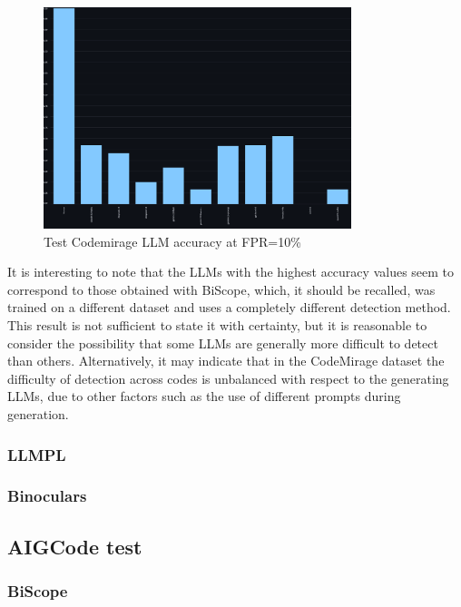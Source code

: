\begin{figure}[H]
    \centering
    \includegraphics[width=0.8\textwidth]{img/TEST/UncovernngLLM/Clearcode/visualization(10).png}
    \caption{Test Codemirage LLM accuracy at FPR=10\%}
    \label{fig:9}
\end{figure}

It is interesting to note that the LLMs with the highest accuracy values 
seem to correspond to those obtained with BiScope, which, it should be 
recalled, was trained on a different dataset and uses a completely 
different detection method. This result is not sufficient to state it 
with certainty, but it is reasonable to consider the possibility that 
some LLMs are generally more difficult to detect than others. 
Alternatively, it may indicate that in the CodeMirage dataset the 
difficulty of detection across codes is unbalanced with respect to 
the generating LLMs, due to other factors such as the use of different 
prompts during generation.
\subsubsection{LLMPL}





\subsubsection{Binoculars}



\subsection{AIGCode test}


\subsubsection{BiScope}

